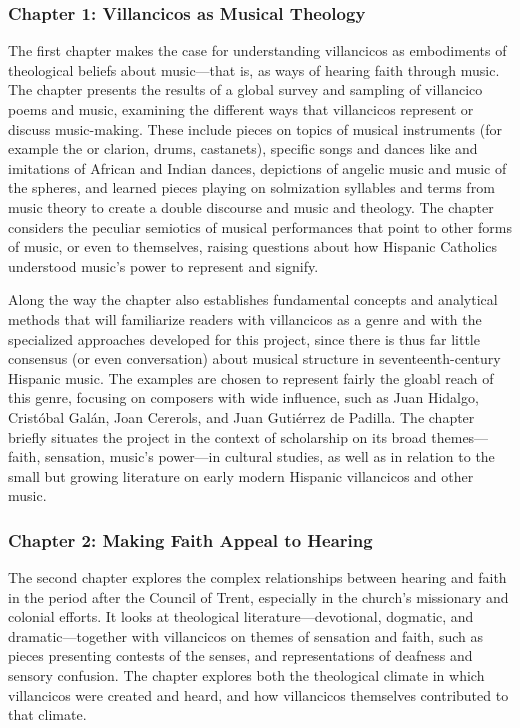 \documentclass{vcbook-proposal}
\begin{document}
\subsubsection{Chapter 1: Villancicos as Musical Theology}

The first chapter makes the case for understanding villancicos as embodiments of theological beliefs about music---that is, as ways of hearing faith through music.
The chapter presents the results of a global survey and sampling of villancico poems and music, examining the different ways that villancicos represent or discuss music-making.
These include pieces on topics of musical instruments (for example the  or clarion, drums, castanets), specific songs and dances like  and imitations of African and Indian dances, depictions of angelic music and music of the spheres, and learned pieces playing on solmization syllables and terms from music theory to create a double discourse and music and theology.
The chapter considers the peculiar semiotics of musical performances that point to other forms of music, or even to themselves, raising questions about how Hispanic Catholics understood music's power to represent and signify.

Along the way the chapter also establishes fundamental concepts and analytical methods that will familiarize readers with villancicos as a genre and with the specialized approaches developed for this project, since there is thus far little consensus (or even conversation) about musical structure in seventeenth-century Hispanic music.
The examples are chosen to represent fairly the gloabl reach of this genre, focusing on composers with wide influence, such as Juan Hidalgo, Cristóbal Galán, Joan Cererols, and Juan Gutiérrez de Padilla.
The chapter briefly situates the project in the context of scholarship on its broad themes---faith, sensation, music's power---in cultural studies, as well as in relation to the small but growing literature on early modern Hispanic villancicos and other music.

\subsubsection{Chapter 2: Making Faith Appeal to Hearing}

The second chapter explores the complex relationships between hearing and faith in the period after the Council of Trent, especially in the church's missionary and colonial efforts.
It looks at theological literature---devotional, dogmatic, and dramatic---together with villancicos on themes of sensation and faith, such as pieces presenting contests of the senses, and representations of deafness and sensory confusion.
The chapter explores both the theological climate in which villancicos were created and heard, and how villancicos themselves contributed to that climate.
\end{document}
